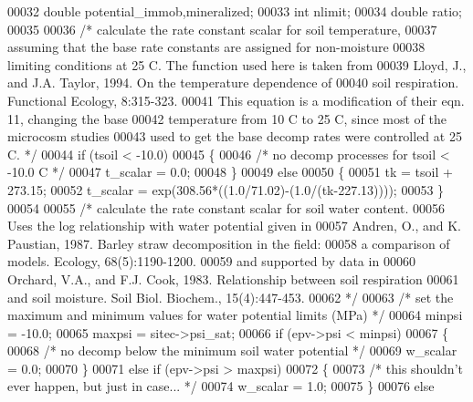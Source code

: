 \begin{DoxyCode}
00032     \textcolor{keywordtype}{double} potential\_immob,mineralized;
00033     \textcolor{keywordtype}{int} nlimit;
00034     \textcolor{keywordtype}{double} ratio;
00035     
00036     \textcolor{comment}{/* calculate the rate constant scalar for soil temperature,}
00037 \textcolor{comment}{    assuming that the base rate constants are assigned for non-moisture}
00038 \textcolor{comment}{    limiting conditions at 25 C. The function used here is taken from}
00039 \textcolor{comment}{    Lloyd, J., and J.A. Taylor, 1994. On the temperature dependence of }
00040 \textcolor{comment}{    soil respiration. Functional Ecology, 8:315-323.}
00041 \textcolor{comment}{    This equation is a modification of their eqn. 11, changing the base}
00042 \textcolor{comment}{    temperature from 10 C to 25 C, since most of the microcosm studies}
00043 \textcolor{comment}{    used to get the base decomp rates were controlled at 25 C. */}
00044     \textcolor{keywordflow}{if} (tsoil < -10.0)
00045     \{
00046         \textcolor{comment}{/* no decomp processes for tsoil < -10.0 C */}
00047         t\_scalar = 0.0;
00048     \}
00049     \textcolor{keywordflow}{else}
00050     \{
00051         tk = tsoil + 273.15;
00052         t\_scalar = exp(308.56*((1.0/71.02)-(1.0/(tk-227.13))));
00053     \}
00054     
00055     \textcolor{comment}{/* calculate the rate constant scalar for soil water content.}
00056 \textcolor{comment}{    Uses the log relationship with water potential given in}
00057 \textcolor{comment}{    Andren, O., and K. Paustian, 1987. Barley straw decomposition in the field:}
00058 \textcolor{comment}{    a comparison of models. Ecology, 68(5):1190-1200.}
00059 \textcolor{comment}{    and supported by data in}
00060 \textcolor{comment}{    Orchard, V.A., and F.J. Cook, 1983. Relationship between soil respiration}
00061 \textcolor{comment}{    and soil moisture. Soil Biol. Biochem., 15(4):447-453.}
00062 \textcolor{comment}{    */}
00063     \textcolor{comment}{/* set the maximum and minimum values for water potential limits (MPa) */}
00064     minpsi = -10.0;
00065     maxpsi = sitec->psi\_sat;
00066     \textcolor{keywordflow}{if} (epv->psi < minpsi)
00067     \{
00068         \textcolor{comment}{/* no decomp below the minimum soil water potential */}
00069         w\_scalar = 0.0;
00070     \}
00071     \textcolor{keywordflow}{else} \textcolor{keywordflow}{if} (epv->psi > maxpsi)
00072     \{
00073         \textcolor{comment}{/* this shouldn't ever happen, but just in case... */}
00074         w\_scalar = 1.0;
00075     \}
00076     \textcolor{keywordflow}{else}

\end{DoxyCode}
